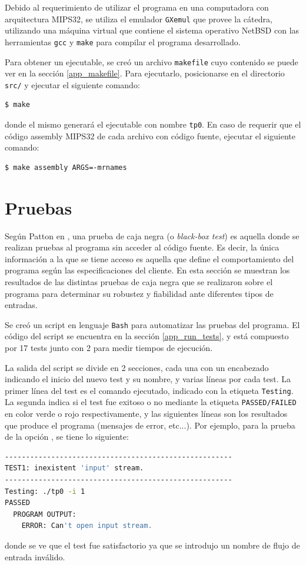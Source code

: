 Debido al requerimiento de utilizar el programa en una computadora con arquitectura MIPS32, se utiliza el emulador \texttt{GXemul} que provee la cátedra, utilizando una máquina virtual que contiene el sistema operativo NetBSD con las herramientas \texttt{gcc} y \texttt{make} para compilar el programa desarrollado.

Para obtener un ejecutable, se creó un archivo \texttt{makefile} cuyo contenido se puede ver en la sección \ref{app_makefile}. Para ejecutarlo, posicionarse en el directorio \texttt{src/} y ejecutar el siguiente comando:
\begin{lstlisting}[language=bash, style=StyleC]
    $ make
\end{lstlisting}

donde el mismo generará el ejecutable con nombre \texttt{tp0}. En caso de requerir que el código assembly MIPS32 de cada archivo con código fuente, ejecutar el siguiente comando:
\begin{lstlisting}[language=bash, style=StyleC]
    $ make assembly ARGS=-mrnames
\end{lstlisting}

\clearpage
\section{Pruebas}

Según Patton en \cite{book_patton}, una prueba de caja negra (o \emph{black-box test}) es aquella donde se realizan pruebas al programa sin acceder al código fuente. Es decir, la única información a la que se tiene acceso es aquella que define el comportamiento del programa según las especificaciones del cliente. En esta sección se muestran los resultados de las distintas pruebas de caja negra que se realizaron sobre el programa para determinar su robustez y fiabilidad ante diferentes tipos de entradas.

Se creó un script en lenguaje \texttt{Bash} para automatizar las pruebas del programa.  El código del script se encuentra en la sección \ref{app_run_tests}, y está compuesto por 17 tests junto con 2 para medir tiempos de ejecución.

La salida del script se divide en 2 secciones, cada una con un encabezado indicando el inicio del nuevo test y su nombre, y varias líneas por cada test. La primer línea del test es el comando ejecutado, indicado con la etiqueta \texttt{Testing}. La segunda indica si el test fue exitoso o no mediante la etiqueta \texttt{PASSED/FAILED} en color verde o rojo respectivamente, y las siguientes líneas son los resultados que produce el programa (mensajes de error, etc...). Por ejemplo, para la prueba de la opción , se tiene lo siguiente:
\begin{lstlisting}[language=bash, style=StyleC]
------------------------------------------------------
TEST1: inexistent 'input' stream.
------------------------------------------------------
Testing: ./tp0 -i 1
PASSED
  PROGRAM OUTPUT:
	ERROR: Can't open input stream.
\end{lstlisting}
donde se ve que el test fue satisfactorio ya que se introdujo un nombre de flujo de entrada inválido.

